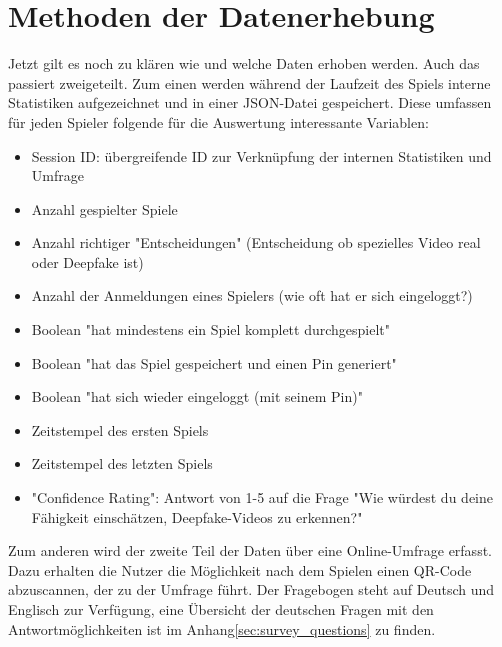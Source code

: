 \section{Methoden der Datenerhebung}
Jetzt gilt es noch zu klären wie und welche Daten erhoben werden. 
Auch das passiert zweigeteilt. 
Zum einen werden während der Laufzeit des Spiels interne Statistiken aufgezeichnet und in einer JSON-Datei gespeichert. 
Diese umfassen für jeden Spieler folgende für die Auswertung interessante Variablen:
\begin{itemize}
    \item Session ID: übergreifende ID zur Verknüpfung der internen Statistiken und Umfrage
    \item Anzahl gespielter Spiele
    \item Anzahl richtiger "Entscheidungen" (Entscheidung ob spezielles Video real oder Deepfake ist)
    \item Anzahl der Anmeldungen eines Spielers (wie oft hat er sich eingeloggt?)
    \item Boolean "hat mindestens ein Spiel komplett durchgespielt"
    \item Boolean "hat das Spiel gespeichert und einen Pin generiert"
    \item Boolean "hat sich wieder eingeloggt (mit seinem Pin)"
    \item Zeitstempel des ersten Spiels
    \item Zeitstempel des letzten Spiels
    \item "Confidence Rating": Antwort von 1-5 auf die Frage "Wie würdest du deine Fähigkeit einschätzen, Deepfake-Videos zu erkennen?"
\end{itemize}
Zum anderen wird der zweite Teil der Daten über eine Online-Umfrage erfasst. 
Dazu erhalten die Nutzer die Möglichkeit nach dem Spielen einen QR-Code abzuscannen, der zu der Umfrage führt. 
Der Fragebogen steht auf Deutsch und Englisch zur Verfügung, 
eine Übersicht der deutschen Fragen mit den Antwortmöglichkeiten ist im Anhang\ref{sec:survey_questions} zu finden.

